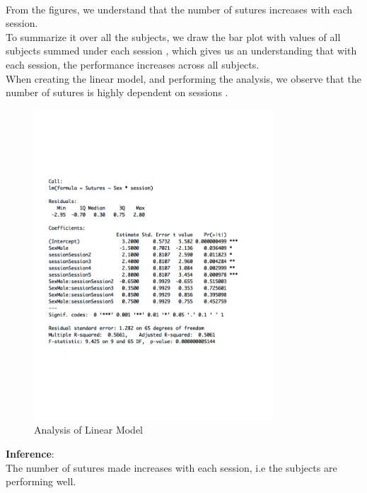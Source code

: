 \documentclass[12pt,epsf]{report}
\begin{document}
\\
From the figures, we understand that the number of sutures increases with each session. \\
To summarize it over all the subjects, we draw the bar plot with values of all subjects summed under each session , which gives us an understanding that with each session, the performance increases across all subjects.\\
When creating the linear model, and performing the analysis, we observe that the number of sutures is highly dependent on sessions .
\begin{figure}[!htb]
	\centering
	\includegraphics[width=0.8\textwidth]{Suture_Sex_Summary.pdf}
	\caption{Analysis of Linear Model}
	\centering
\end{figure}
\textbf{Inference}:\\
The number of sutures made increases with each session, i.e the subjects are performing well.\\
\\
\FloatBarrier
\end{document}
